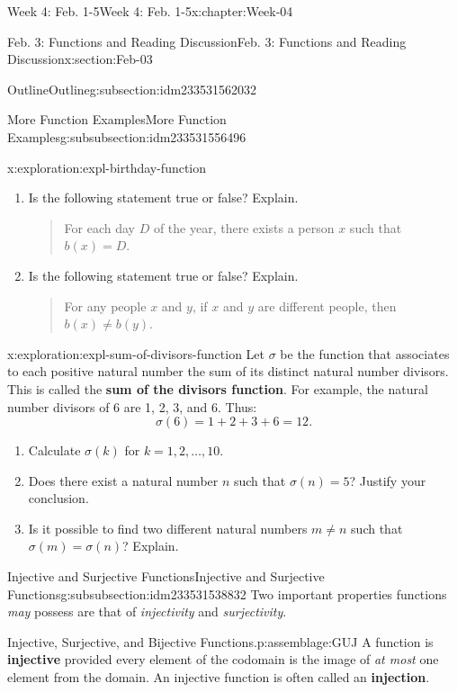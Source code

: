 \documentclass[oneside,10pt,]{book}
\newcommand{\terminology}[1]{\textbf{#1}}
\numberwithin{equation}{section}
\begin{document}
\begin{chapterptx}{Week 4: Feb. 1-5}{}{Week 4: Feb. 1-5}{}{}{x:chapter:Week-04}
\begin{sectionptx}{Feb. 3: Functions and Reading Discussion}{}{Feb. 3: Functions and Reading Discussion}{}{}{x:section:Feb-03}
\begin{subsectionptx}{Outline}{}{Outline}{}{}{g:subsection:idm233531562032}
\begin{subsubsectionptx}{More Function Examples}{}{More Function Examples}{}{}{g:subsubsection:idm233531556496}
\begin{exploration}{}{x:exploration:expl-birthday-function}
\begin{enumerate}
\item{}Is the following statement true or false? Explain. \begin{quote}%
For each day \(D\) of the year, there exists a person \(x\) such that \(b(x)=D\).\end{quote}
%
\item{}Is the following statement true or false? Explain. \begin{quote}%
For any people \(x\) and \(y\), if \(x\) and \(y\) are different people, then \(b(x) \ne b(y)\).\end{quote}
%
\end{enumerate}
\end{exploration}%
\begin{exploration}{}{x:exploration:expl-sum-of-divisors-function}%
Let \(\sigma\) be the function that associates to each positive natural number the sum of its distinct natural number divisors. This is called the \terminology{sum of the divisors function}. For example, the natural number divisors of 6 are 1, 2, 3, and 6. Thus:%
\begin{equation*}
\sigma(6) = 1  + 2 + 3 +6 = 12.
\end{equation*}
%
%
\begin{enumerate}
\item{}Calculate \(\sigma(k)\) for \(k = 1, 2, \ldots, 10\).%
\item{}Does there exist a natural number \(n\) such that \(\sigma(n) = 5\)? Justify your conclusion.%
\item{}Is it possible to find two different natural numbers \(m \ne n\) such that \(\sigma(m) = \sigma(n)\)? Explain.%
\end{enumerate}
\end{exploration}%
\end{subsubsectionptx}
%
%
\typeout{************************************************}
\typeout{************************************************}
%
\begin{subsubsectionptx}{Injective and Surjective Functions}{}{Injective and Surjective Functions}{}{}{g:subsubsection:idm233531538832}
Two important properties functions \emph{may} possess are that of \emph{injectivity} and \emph{surjectivity}.%
\begin{assemblage}{Injective, Surjective, and Bijective Functions.}{p:assemblage:GUJ}%
A function is \terminology{injective} provided every element of the codomain is the image of \emph{at most} one element from the domain. An injective function is often called an \terminology{injection}.%

\end{assemblage}
\end{subsubsectionptx}
\end{subsectionptx}
\end{sectionptx}
\end{chapterptx}
\end{document}
